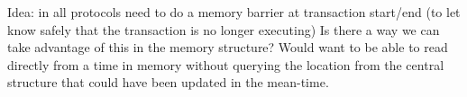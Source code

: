 \documentclass[11pt,letterpaper]{article}
\begin{document}
Idea: in all protocols need to do a memory barrier at transaction start/end (to let know safely that the transaction is no longer executing)
Is there a way we can take advantage of this in the memory structure?
Would want to be able to read directly from a time in memory without querying the location from the central structure that could have been updated
in the mean-time.
\end{document}
